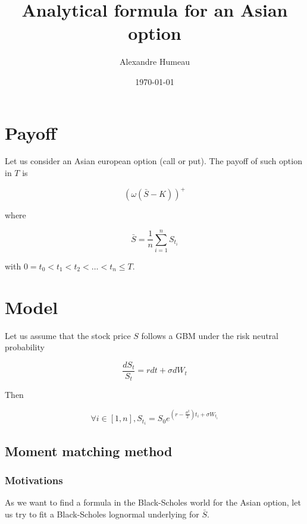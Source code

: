 \documentclass{article}
\begin{document}
\title{Analytical formula for an Asian option}
\author{Alexandre Humeau}
\date{\today}
\maketitle

\section{Payoff}

Let us consider an Asian european option (call or put). The payoff of such option in $T$ is 

\begin{equation}
	\left(\omega \left( \bar{S} - K\right)\right)^+
\end{equation}

\noindent where

\begin{equation}
	\bar{S} = \frac{1}{n} \sum_{i=1}^n S_{t_i}
\end{equation}
 
\noindent with $0 = t_0 < t_1 < t_2 < \dots < t_n \leq T$.

\section{Model}

Let us assume that the stock price $S$ follows a GBM under the risk neutral probability

\begin{equation}
	\frac{dS_t}{S_t} = rdt + \sigma dW_t
\end{equation}

\noindent Then

\begin{equation}
	\forall i \in [1,n], S_{t_i} = S_0 e^{(r - \frac{\sigma^2}{2})t_i + \sigma W_{t_i}}
\end{equation}

\subsection{Moment matching method}
\subsubsection{Motivations}
As we want to find a formula in the Black-Scholes world for the Asian option, let us try to fit a Black-Scholes lognormal underlying for $\bar{S}$.
\end{document}
